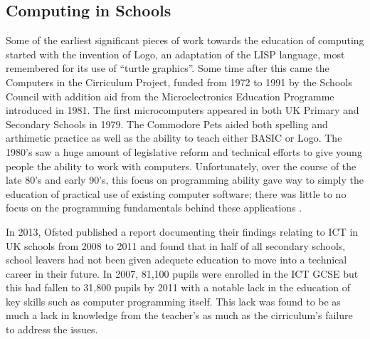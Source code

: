 \documentclass[11pt, abstracton, twoside]{scrartcl}
\begin{document}
\subsection{Computing in Schools}
Some of the earliest significant pieces of work towards the 
education of computing started with the invention of Logo, an adaptation of 
the LISP language, most remembered for its use of ``turtle graphics''. Some 
time after this came the Computers in the Cirriculum Project, funded from 
1972 to 1991 by the Schools Council with addition aid from the Microelectronics 
Education Programme introduced in 1981. The first microcomputers appeared in 
both UK Primary and Secondary Schools in 1979. The Commodore Pets aided both 
spelling and arthimetic practice as well as the ability to teach either BASIC or 
Logo. The 1980's saw a huge amount of legislative reform and technical efforts 
to give young people the ability to work with computers. Unfortunately, over the 
course of the late 80's and early 90's, this focus on programming ability gave 
way to simply the education of practical use of existing computer software; 
there was little to no focus on the programming fundamentals behind 
these applications \cite{naec}.

In 2013, Ofsted published a report documenting their findings relating to ICT 
in UK schools from 2008 to 2011 and found that in half of all secondary 
schools, school leavers had not been given adequete education to move into a 
technical career in their future. In 2007, 81,100 pupils were enrolled in the 
ICT GCSE but this had fallen to 31,800 pupils by 2011 \cite{DfEO13} with a 
notable lack in the education of key skills such as computer programming 
itself. This lack was found to be as much a lack in knowledge from the 
teacher's as much as the cirriculum's failure to address the issues.
\end{document}
